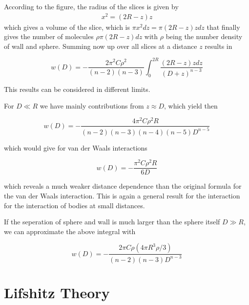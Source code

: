 \documentclass[letterpaper,10pt,english]{sphinxmanual}
\let\sphinxpxdimen\pdfpxdimen\else\newdimen\sphinxpxdimen
\begin{document}
\noindent\sphinxincludegraphics[width=357\sphinxpxdimen,height=301\sphinxpxdimen]{{sphere_wall}.png}

\sphinxAtStartPar
According to the figure, the radius of the slices is given by
\begin{equation*}
\begin{split}x^2=(2R-z)z\end{split}
\end{equation*}
\sphinxAtStartPar
which gives a volume of the slice, which is \(\pi x^2 dz=\pi (2R-z)z dz\) that finally gives the number of molecules \(\rho \pi (2R-z)dz\) with \(\rho\) being the number density of wall and sphere. Summing now up over all slices at a distance \(z\) results in

\sphinxAtStartPar
\begin{equation}
w(D)=-\frac{2\pi^2 C \rho^2}{(n-2)(n-3)}\int_0^{2R}\frac{(2R-z)zdz}{(D+z)^{n-3}}
\end{equation}

\sphinxAtStartPar
This results can be considered in different limits.

\sphinxAtStartPar
For \(D\ll R\) we have mainly contributions from \(z\approx D\), which yield then

\sphinxAtStartPar
\begin{equation}
w(D)=-\frac{4\pi^2 C \rho^2 R}{(n-2)(n-3)(n-4)(n-5)D^{n-5}}
\end{equation}

\sphinxAtStartPar
which would give for van der Waals interactions

\sphinxAtStartPar
\begin{equation}
w(D)=-\frac{\pi^2 C \rho^2 R}{6D}
\end{equation}

\sphinxAtStartPar
which reveals a much weaker distance dependence than the original formula for the van der Waals interaction. This is again a general result for the interaction for the interaction of bodies at small distances.

\sphinxAtStartPar
If the seperation of sphere and wall is much larger than the sphere itself \(D\gg R\), we can approximate the above integral with

\sphinxAtStartPar
\begin{equation}
w(D)=-\frac{2\pi C \rho (4\pi R^3 \rho/3 )}{(n-2)(n-3)D^{n-3}}
\end{equation}


\section{Lifshitz Theory}
\label{\detokenize{notebooks/L11/1_van_der_Waals:Lifshitz-Theory}}
\end{document}
